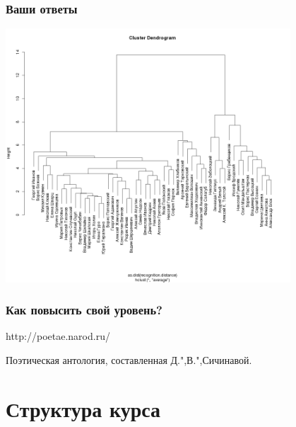 \documentclass{beamer}
\begin{document}
\begin{frame}
\frametitle{Ваши ответы}
\begin{center}
\includegraphics[width=0.8\textwidth]{clust3.png}
\end{center}
\end{frame}


\begin{frame}
\frametitle{Как повысить свой уровень?}

\begin{center}
{\LARGE http://poetae.narod.ru/}
\end{center}

Поэтическая антология, составленная Д.",В.",Сичинавой.

\end{frame}


\section{Структура курса}\label{sec:struct}


\end{document}
